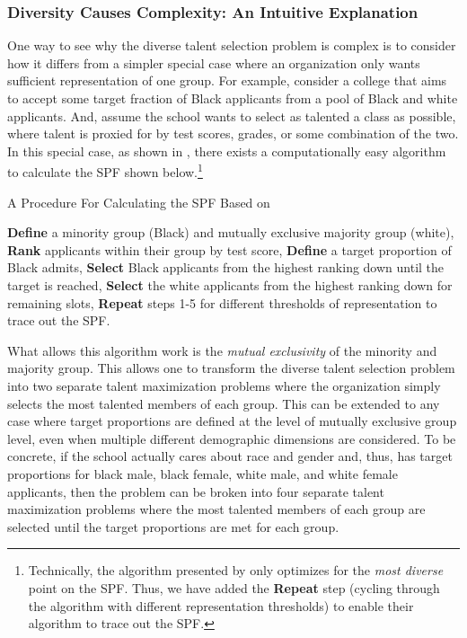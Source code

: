 \subsubsection{Diversity Causes Complexity: An Intuitive Explanation}\label{subsubsec:int_nphard}

One way to see why the diverse talent selection problem is complex is to consider how it differs from a simpler special case where an organization only wants sufficient representation of one group. For example, consider a college that aims to accept some target fraction of Black applicants from a pool of Black and white applicants. And, assume the school wants to select as talented a class as possible, where talent is proxied for by test scores, grades, or some combination of the two. In this special case, as shown in \textcite{kleinberg2018algorithmic}, there exists a computationally easy algorithm to calculate the SPF shown below.\footnote{Technically, the algorithm presented by \textcite{kleinberg2018algorithmic} only optimizes for the \emph{most diverse} point on the SPF. Thus, we have added the \textbf{Repeat} step (cycling through the algorithm with different representation thresholds) to enable their algorithm to trace out the SPF.}

\begin{algorithm}
    \caption{A Procedure For Calculating the SPF Based on \textcite{kleinberg2018algorithmic}}\label{alg:kleinberg}
    \begin{algorithmic}
        \State \textbf{Define} a minority group (Black) and mutually exclusive majority group (white), 
        \State \textbf{Rank} applicants within their group by test score,
        \State \textbf{Define} a target proportion of Black admits,
        \State \textbf{Select} Black applicants from the highest ranking down until the target is reached,
        \State \textbf{Select} the white applicants from the highest ranking down for remaining slots,
        \State \textbf{Repeat} steps 1-5 for different thresholds of representation to trace out the SPF.
    \end{algorithmic}
\end{algorithm}

What allows this algorithm work is the \emph{mutual exclusivity} of the minority and majority group. This allows one to transform the diverse talent selection problem into two separate talent maximization problems where the organization simply selects the most talented members of each group. This can be extended to any case where target proportions are defined at the level of mutually exclusive group level, even when multiple different demographic dimensions are considered. To be concrete, if the school actually cares about race and gender and, thus, has target proportions for black male, black female, white male, and white female applicants, then the problem can be broken into four separate talent maximization problems where the most talented members of each group are selected until the target proportions are met for each group. 

